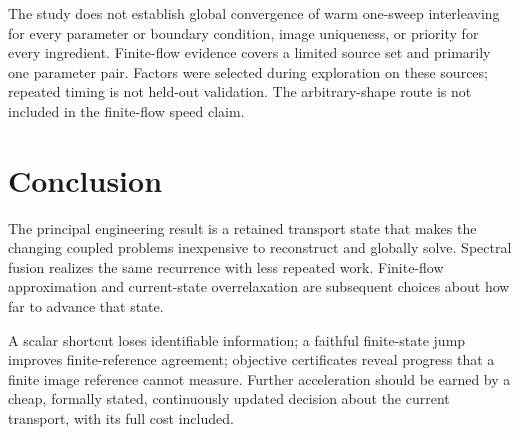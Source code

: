\documentclass[10pt,twocolumn]{article}
\theoremstyle{definition}\newtheorem{remark}[proposition]{Remark}
\begin{document}
The study does not establish global convergence of warm one-sweep
interleaving for every parameter or boundary condition, image uniqueness,
or priority for every ingredient. Finite-flow evidence covers a limited
source set and primarily one parameter pair. Factors were selected during
exploration on these sources; repeated timing is not held-out validation.
The arbitrary-shape route is not included in the finite-flow speed claim.

\section{Conclusion}
The principal engineering result is a retained transport state that makes
the changing coupled problems inexpensive to reconstruct and globally
solve. Spectral fusion realizes the same recurrence with less repeated
work. Finite-flow approximation and current-state overrelaxation are
subsequent choices about how far to advance that state.

A scalar shortcut loses identifiable information; a faithful finite-state
jump improves finite-reference agreement; objective certificates reveal
progress that a finite image reference cannot measure. Further
acceleration should be earned by a cheap, formally stated, continuously
updated decision about the current transport, with its full cost included.
\end{document}
